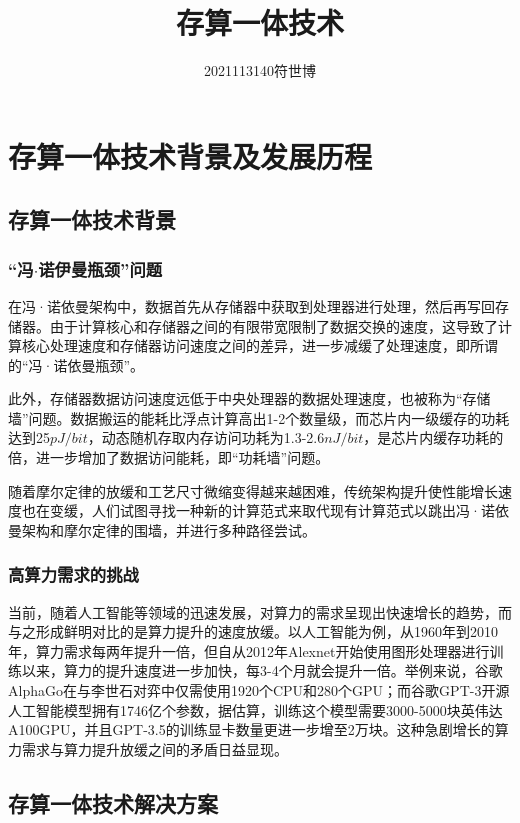 \documentclass[withoutpreface,bwprint]{cumcmthesis}
\title{存算一体技术}
\author{2021113140符世博}
\date{}
\begin{document}
\maketitle

\section{存算一体技术背景及发展历程}
\subsection{存算一体技术背景}

\subsubsection{“冯$\cdot$诺伊曼瓶颈”问题}
在冯·诺依曼架构中，数据首先从存储器中获取到处理器进行处理，然后再写回存储器。由于计算核心和存储器之间的有限带宽限制了数据交换的速度，这导致了计算核心处理速度和存储器访问速度之间的差异，进一步减缓了处理速度，即所谓的“冯·诺依曼瓶颈”。

此外，存储器数据访问速度远低于中央处理器的数据处理速度，也被称为“存储墙”问题。数据搬运的能耗比浮点计算高出1-2个数量级，而芯片内一级缓存的功耗达到25$pJ/bit$，动态随机存取内存访问功耗为1.3-2.6$nJ/bit$，是芯片内缓存功耗的倍，进一步增加了数据访问能耗，即“功耗墙”问题。

随着摩尔定律的放缓和工艺尺寸微缩变得越来越困难，传统架构提升使性能增长速度也在变缓，人们试图寻找一种新的计算范式来取代现有计算范式以跳出冯·诺依曼架构和摩尔定律的围墙，并进行多种路径尝试。


\subsubsection{高算力需求的挑战}
当前，随着人工智能等领域的迅速发展，对算力的需求呈现出快速增长的趋势，而与之形成鲜明对比的是算力提升的速度放缓。以人工智能为例，从1960年到2010年，算力需求每两年提升一倍，但自从2012年Alexnet开始使用图形处理器进行训练以来，算力的提升速度进一步加快，每3-4个月就会提升一倍。举例来说，谷歌AlphaGo在与李世石对弈中仅需使用1920个CPU和280个GPU；而谷歌GPT-3开源人工智能模型拥有1746亿个参数，据估算，训练这个模型需要3000-5000块英伟达A100GPU，并且GPT-3.5的训练显卡数量更进一步增至2万块。这种急剧增长的算力需求与算力提升放缓之间的矛盾日益显现。


\subsection{存算一体技术解决方案}
\end{document}
